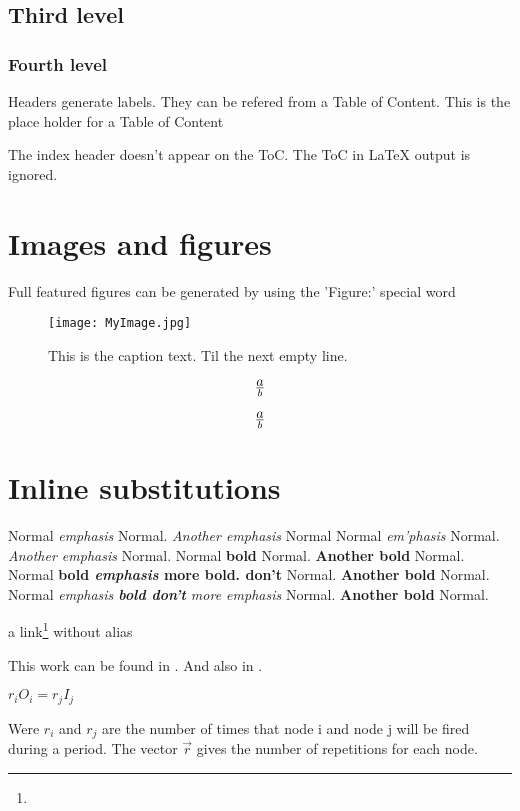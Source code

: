 \subsection{Third level}

\subsubsection{Fourth level}

Headers generate labels.
They can be refered from a Table of Content.
This is the place holder for a Table of Content



The index header doesn't appear on the ToC.
The ToC in LaTeX output is ignored.

\section{Images and figures}
\label{OtherLabel}

Full featured figures can be generated by using the 'Figure:' special word
\begin{figure*}[htbp]
\begin{center}\texttt{[image: MyImage.jpg]}\end{center}
\caption{%
This is the caption text.
Til the next empty line.
}
\label{MyLabel}
\end{figure*}


\[
a\over{b}
\]

\begin{equation}
a\over{b}
\end{equation}



\section{Inline substitutions}

Normal {\em emphasis} Normal. {\em Another emphasis} Normal
Normal {\em em'phasis} Normal. {\em Another emphasis} Normal.
Normal {\bf bold} Normal. {\bf Another bold} Normal.
Normal {\bf bold {\em emphasis} more bold. don't } Normal. {\bf Another bold} Normal.
Normal {\em emphasis {\bf bold don't} more emphasis} Normal. {\bf Another bold} Normal.

a link\footnote{}
 without alias

This work can be found in \cite{lee87}. And also in \cite{www-CLAM}.


$r_iO_i=r_jI_j$

Were $r_i$ and $r_j$ are the number of times that node i and node j will be fired during a period. The vector $\vec{r}$ gives the number of repetitions for each node.


